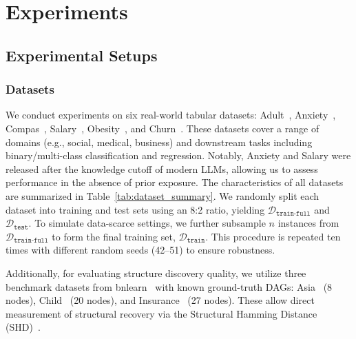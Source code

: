 \section{Experiments}
\subsection{Experimental Setups}
\subsubsection{Datasets}
We conduct experiments on six real-world tabular datasets: Adult~\cite{adult_2}, Anxiety~\cite{kaggleSocialAnxiety}, Compas~\cite{propublicaMachineBias}, Salary~\cite{kaggleGlobalMarket}, Obesity~\cite{obesity}, and Churn~\cite{churn}. These datasets cover a range of domains (e.g., social, medical, business) and downstream tasks including binary/multi-class classification and regression. Notably, Anxiety and Salary were released after the knowledge cutoff of modern LLMs, allowing us to assess performance in the absence of prior exposure. The characteristics of all datasets are summarized in Table~\ref{tab:dataset_summary}. We randomly split each dataset into training and test sets using an 8:2 ratio, yielding $\mathcal{D}_\mathtt{train\text{-}full}$ and $\mathcal{D}_\mathtt{test}$. To simulate data-scarce settings, we further subsample $n$ instances from $\mathcal{D}_\mathtt{train\text{-}full}$ to form the final training set, $\mathcal{D}_\mathtt{train}$. This procedure is repeated ten times with different random seeds (42--51) to ensure robustness.

Additionally, for evaluating structure discovery quality, we utilize three benchmark datasets from bnlearn~\cite{scutari2010learning} with known ground-truth DAGs: Asia~\cite{bnlearn-repo-asia} (8 nodes), Child~\cite{bnlearn-repo-child} (20 nodes), and Insurance~\cite{bnlearn-repo-insurance} (27 nodes). These allow direct measurement of structural recovery via the Structural Hamming Distance (SHD)~\cite{de2009comparison}.

